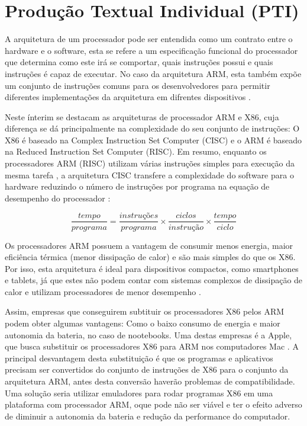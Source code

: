 \chapter{Produção Textual Individual (PTI)}
\label{pti}

A arquitetura de um processador
pode ser entendida como um contrato entre o hardware e o software,
esta se refere a um especificação funcional do processador que determina
como este irá se comportar, quais instruções possui
e quais instruções é capaz de executar. No caso da arquitetura ARM, esta também expõe um conjunto
de instruções comuns para os desenvolvedores para permitir diferentes implementações da arquitetura
em difrentes dispositivos \cite{arm}.

Neste ínterim se destacam as arquiteturas de processador ARM e X86, cuja
diferença se dá principalmente na complexidade do seu conjunto de instruções: O X86 é baseado na
Complex Instruction Set Computer (CISC) e o ARM é baseado na Reduced Instruction Set Computer (RISC).
Em resumo, enquanto os processadores ARM (RISC) utilizam várias instruções simples para execução da mesma tarefa \cite{tndbrasil}, a arquitetura CISC transfere a complexidade do software para o hardware reduzindo 
o número de instruções por programa na
equação de desempenho do processador \cite{bhandarkar}:

\begin{equation}
 \frac{tempo}{programa} = \frac{instruções}{programa} \times \frac{ciclos}{instrução} \times \frac{tempo}{ciclo}
\end{equation}

Os processadores ARM possuem a vantagem de consumir menos energia, maior eficiência térmica (menor dissipação de calor) e são
mais simples do que os X86. Por isso, esta arquitetura é ideal para dispositivos compactos, como smartphones e tablets,
já que estes não podem contar com sistemas complexos de dissipação de calor e utilizam processadores
de menor desempenho \cite{canaltech}.

Assim, empresas que conseguirem subtituir os processadores X86 pelos ARM podem obter algumas
vantagens: Como o baixo consumo de energia e maior autonomia da bateria, no caso de nootebooks.
Uma destas empresas é a Apple, que busca substituir os processadores X86 para ARM nos computadores Mac \cite{super}.
A principal desvantagem desta substituição é que os programas e aplicativos
precisam ser convertidos do conjunto de instruções de X86 para o conjunto da arquitetura ARM,
antes desta conversão haverão problemas de compatibilidade.
Uma solução seria utilizar emuladores para rodar programas X86 em uma plataforma com
processador ARM, oque pode não ser viável e ter o efeito
adverso de diminuir a autonomia da bateria e redução da performance do computador.
